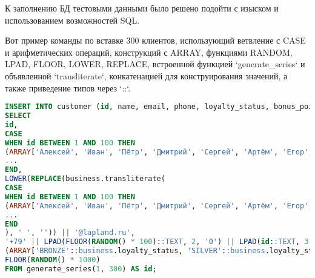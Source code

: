 К заполнению БД тестовыми данными было решено подойти с изыском и использованием возможностей SQL\@.

Вот пример команды по вставке 300 клиентов, использующий ветвление с CASE и арифметических операций,
конструкций с ARRAY, функциями RANDOM, LPAD, FLOOR, LOWER, REPLACE, встроенной функцией `generate\_series`
и объявленной `transliterate`, конкатенацией для конструирования значений, а также приведение типов через `::`.

\begin{lstlisting}[language=SQL, frame=single, basicstyle=\small\ttfamily, breaklines=true,label={lst:examplecustomer}]
INSERT INTO customer (id, name, email, phone, loyalty_status, bonus_points)
SELECT
id,
CASE
WHEN id BETWEEN 1 AND 100 THEN
(ARRAY['Алексей', 'Иван', 'Пётр', 'Дмитрий', 'Сергей', 'Артём', 'Егор', 'Михаил', 'Олег', 'Владимир'])[(id - 1) % 10 + 1]
...
END,
LOWER(REPLACE(business.transliterate(
CASE
WHEN id BETWEEN 1 AND 100 THEN
(ARRAY['Алексей', 'Иван', 'Пётр', 'Дмитрий', 'Сергей', 'Артём', 'Егор', 'Михаил', 'Олег', 'Владимир'])[(id - 1) % 10 + 1]
...
END
), ' ', '')) || '@lapland.ru',
'+79' || LPAD(FLOOR(RANDOM() * 100)::TEXT, 2, '0') || LPAD(id::TEXT, 3, '0') || LPAD(FLOOR(RANDOM() * 10000)::TEXT, 4, '0'),
(ARRAY['BRONZE'::business.loyalty_status, 'SILVER'::business.loyalty_status, 'GOLD'::business.loyalty_status])[FLOOR(RANDOM() * 3 + 1)],
FLOOR(RANDOM() * 1000)
FROM generate_series(1, 300) AS id;
\end{lstlisting}